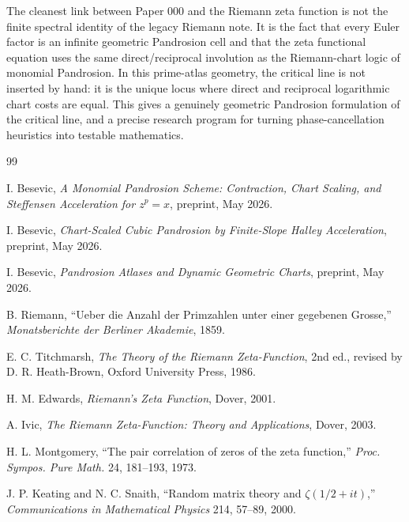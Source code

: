 \documentclass[11pt]{article}
\begin{document}
The cleanest link between Paper 000 and the Riemann zeta function is not the
finite spectral identity of the legacy Riemann note.  It is the fact that every
Euler factor is an infinite geometric Pandrosion cell and that the zeta
functional equation uses the same direct/reciprocal involution as the
Riemann-chart logic of monomial Pandrosion.  In this prime-atlas geometry, the
critical line is not inserted by hand: it is the unique locus where direct and
reciprocal logarithmic chart costs are equal.  This gives a genuinely geometric
Pandrosion formulation of the critical line, and a precise research program for
turning phase-cancellation heuristics into testable mathematics.

\begin{thebibliography}{99}

I. Besevic, \emph{A Monomial Pandrosion Scheme: Contraction, Chart Scaling,
and Steffensen Acceleration for \(z^p=x\)}, preprint, May 2026.

I. Besevic, \emph{Chart-Scaled Cubic Pandrosion by Finite-Slope Halley
Acceleration}, preprint, May 2026.

I. Besevic, \emph{Pandrosion Atlases and Dynamic Geometric Charts}, preprint,
May 2026.

B. Riemann, ``Ueber die Anzahl der Primzahlen unter einer gegebenen
Grosse,'' \emph{Monatsberichte der Berliner Akademie}, 1859.

E. C. Titchmarsh, \emph{The Theory of the Riemann Zeta-Function}, 2nd ed.,
revised by D. R. Heath-Brown, Oxford University Press, 1986.

H. M. Edwards, \emph{Riemann's Zeta Function}, Dover, 2001.

A. Ivic, \emph{The Riemann Zeta-Function: Theory and Applications}, Dover,
2003.

H. L. Montgomery, ``The pair correlation of zeros of the zeta function,''
\emph{Proc. Sympos. Pure Math.} 24, 181--193, 1973.

J. P. Keating and N. C. Snaith, ``Random matrix theory and
\(\zeta(1/2+it)\),'' \emph{Communications in Mathematical Physics} 214,
57--89, 2000.

\end{thebibliography}
\end{document}
